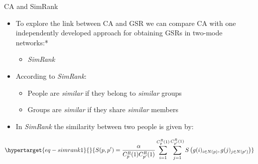 \documentclass[
  ignorenonframetext,
]{beamer}
\providecommand{\tightlist}{%
  \setlength{\itemsep}{0pt}\setlength{\parskip}{0pt}}\usepackage{longtable,booktabs,array}
\begin{document}
\begin{frame}{CA and SimRank}
\protect\hypertarget{ca-and-simrank}{}
\begin{itemize}
\tightlist
\item
  To explore the link between CA and GSR we can compare CA with one
  independently developed approach for obtaining GSRs in two-mode
  networks:*

  \begin{itemize}
  \tightlist
  \item
    \emph{SimRank}
  \end{itemize}
\item
  According to \emph{SimRank}:

  \begin{itemize}
  \tightlist
  \item
    People are \emph{similar} if they belong to \emph{similar} groups
  \item
    Groups are \emph{similar} if they share \emph{similar} members
  \end{itemize}
\item
  In \emph{SimRank} the similarity between two people is given by:
\end{itemize}

\begin{equation}\protect\hypertarget{eq-simrank1}{}{
S(p, p') = \frac{\alpha}{C_p^R(1)C_{p'}^R(1)}
    \sum_{i = 1}^{C_p^R(1)} \sum_{j = 1}^{C_{p'}^R(1)} 
    S\left(g(i)_{i \in N(p)}, g(j)_{j \in N(p')}\right)
}\label{eq-simrank1}\end{equation}

\end{frame}
\end{document}
